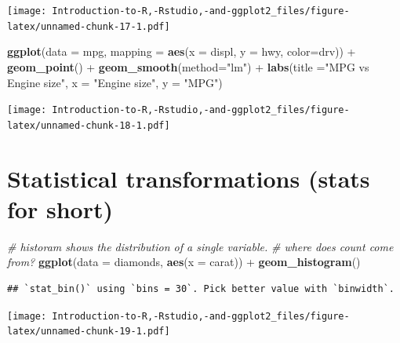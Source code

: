 \documentclass[]{book}
\newenvironment{Shaded}{\begin{snugshade}}{\end{snugshade}}
\newcommand{\KeywordTok}[1]{\textcolor[rgb]{0.13,0.29,0.53}{\textbf{{#1}}}}
\newcommand{\DataTypeTok}[1]{\textcolor[rgb]{0.13,0.29,0.53}{{#1}}}
\newcommand{\StringTok}[1]{\textcolor[rgb]{0.31,0.60,0.02}{{#1}}}
\newcommand{\CommentTok}[1]{\textcolor[rgb]{0.56,0.35,0.01}{\textit{{#1}}}}
\newcommand{\NormalTok}[1]{{#1}}
\begin{document}
\texttt{[image: Introduction-to-R,-Rstudio,-and-ggplot2\_files/figure-latex/unnamed-chunk-17-1.pdf]}

\begin{Shaded}
\begin{Highlighting}[]
\KeywordTok{ggplot}\NormalTok{(}\DataTypeTok{data =} \NormalTok{mpg, }\DataTypeTok{mapping =} \KeywordTok{aes}\NormalTok{(}\DataTypeTok{x =} \NormalTok{displ, }\DataTypeTok{y =} \NormalTok{hwy, }\DataTypeTok{color=}\NormalTok{drv)) +}\StringTok{ }\KeywordTok{geom_point}\NormalTok{() +}\StringTok{ }\KeywordTok{geom_smooth}\NormalTok{(}\DataTypeTok{method=}\StringTok{"lm"}\NormalTok{) +}\StringTok{ }\KeywordTok{labs}\NormalTok{(}\DataTypeTok{title =}\StringTok{"MPG vs Engine size"}\NormalTok{, }\DataTypeTok{x =} \StringTok{"Engine size"}\NormalTok{, }\DataTypeTok{y =} \StringTok{"MPG"}\NormalTok{)}
\end{Highlighting}
\end{Shaded}

\texttt{[image: Introduction-to-R,-Rstudio,-and-ggplot2\_files/figure-latex/unnamed-chunk-18-1.pdf]}

\section{\texorpdfstring{Statistical transformations (\textbf{stats} for
short)}{Statistical transformations (stats for short)}}\label{statistical-transformations-stats-for-short}

\begin{Shaded}
\begin{Highlighting}[]
\CommentTok{# historam shows the distribution of a single variable. }
\CommentTok{# where does count come from? }
\KeywordTok{ggplot}\NormalTok{(}\DataTypeTok{data =} \NormalTok{diamonds, }\KeywordTok{aes}\NormalTok{(}\DataTypeTok{x =} \NormalTok{carat)) +}\StringTok{ }\KeywordTok{geom_histogram}\NormalTok{()}
\end{Highlighting}
\end{Shaded}

\begin{verbatim}
## `stat_bin()` using `bins = 30`. Pick better value with `binwidth`.
\end{verbatim}

\texttt{[image: Introduction-to-R,-Rstudio,-and-ggplot2\_files/figure-latex/unnamed-chunk-19-1.pdf]}
\end{document}
